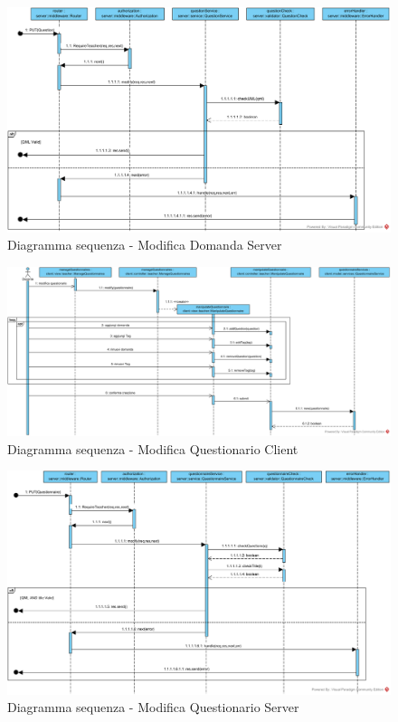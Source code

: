 \documentclass[12pt,a4paper]{article}
\begin{document}
\begin{center}
	\begin{figure}[H]
		\centering \includegraphics[max width=\myheight, angle=90 ]{../img/diagrammiSequenza/modificaDomandaServer.png}
		\caption{Diagramma sequenza - Modifica Domanda Server}
	\end{figure}
\end{center}


\begin{center}
	\begin{figure}[H]
		\centering \includegraphics[max width=\myheight, angle=90 ]{../img/diagrammiSequenza/modificaQuestionarioClient.png}
		\caption{Diagramma sequenza - Modifica Questionario Client}
	\end{figure}
\end{center}


\begin{center}
	\begin{figure}[H]
		\centering \includegraphics[max width=\myheight, angle=90 ]{../img/diagrammiSequenza/modificaQuestionarioServer.png}
		\caption{Diagramma sequenza - Modifica Questionario Server}
	\end{figure}
\end{center}
\end{document}
